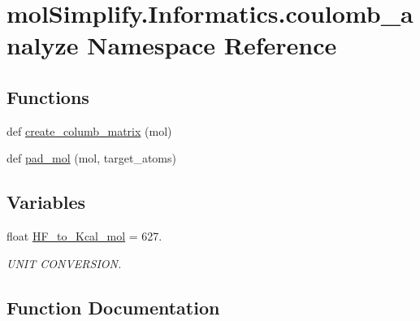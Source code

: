 \hypertarget{namespacemolSimplify_1_1Informatics_1_1coulomb__analyze}{}\section{mol\+Simplify.\+Informatics.\+coulomb\+\_\+analyze Namespace Reference}
\label{namespacemolSimplify_1_1Informatics_1_1coulomb__analyze}
\subsection*{Functions}
\begin{DoxyCompactItemize}
\item 
def \hyperlink{namespacemolSimplify_1_1Informatics_1_1coulomb__analyze_a349112f635d910243066420a87f9b54b}{create\+\_\+columb\+\_\+matrix} (mol)
\item 
def \hyperlink{namespacemolSimplify_1_1Informatics_1_1coulomb__analyze_a5f29080dd81e2da4f972395464ca348c}{pad\+\_\+mol} (mol, target\+\_\+atoms)
\end{DoxyCompactItemize}
\subsection*{Variables}
\begin{DoxyCompactItemize}
\item 
float \hyperlink{namespacemolSimplify_1_1Informatics_1_1coulomb__analyze_aa6a9a45ba1092aa019437e356c21fba2}{H\+F\+\_\+to\+\_\+\+Kcal\+\_\+mol} = 627.
\begin{DoxyCompactList}\small\item\em U\+N\+IT C\+O\+N\+V\+E\+R\+S\+I\+ON. \end{DoxyCompactList}\end{DoxyCompactItemize}


\subsection{Function Documentation}
\mbox{\label{namespacemolSimplify_1_1Informatics_1_1coulomb__analyze_a349112f635d910243066420a87f9b54b}} 
